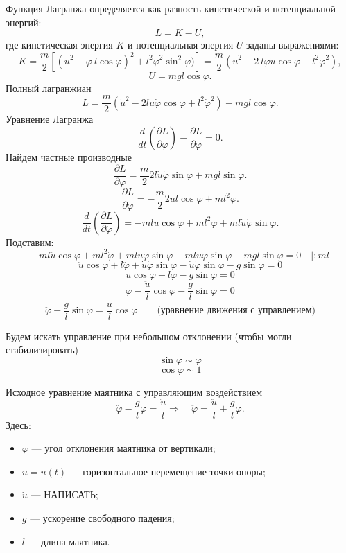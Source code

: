 \documentclass[a4paper, 12pt]{article}
\begin{document}
Функция Лагранжа определяется как разность кинетической и потенциальной энергий:
\[
L = K - U,
\]
где кинетическая энергия \(K\) и потенциальная энергия \(U\) заданы выражениями:
\[
K = \frac{m}{2} [(\dot{u}^2 - \dot\varphi\ l \cos\varphi)^2 + l^2 \dot{\varphi}^2\sin^2\varphi)]=\frac{m}{2} (\dot{u}^2 - 2\ l \dot\varphi\dot{u}\cos\varphi + l^2 \dot{\varphi}^2),
\]
\[
U = mgl\cos\varphi.
\]
Полный лагранжиан
\[
L = \frac{m}{2} (\dot{u}^2 - 2l\dot{u}\dot{\varphi}\cos\varphi + l^2\dot{\varphi}^2) - mgl\cos\varphi.
\]
Уравнение Лагранжа
\[
\frac{d}{dt} \left( \frac{\partial L}{\partial \dot{\varphi}} \right) - \frac{\partial L}{\partial \varphi} = 0.
\]
Найдем частные производные
\[
\frac{\partial L}{\partial \varphi} = \frac{m}{2} 2l\dot{u}\dot{\varphi} \sin\varphi + mgl\sin\varphi.
\]
\[
\frac{\partial L}{\partial \dot{\varphi}} = - \frac{m}{2} 2\dot{u}l\cos\varphi + ml^2\dot{\varphi}.
\]
\[
\frac{d}{dt} \left( \frac{\partial L}{\partial \dot{\varphi}} \right) 
    = -ml\ddot{u} \cos\varphi + ml^2\ddot{\varphi} + ml\dot{u}\dot{\varphi} \sin\varphi.
\]
Подставим:
\[
-ml\ddot{u} \cos\varphi + ml^2\ddot{\varphi} + ml\dot{u}\dot{\varphi} \sin\varphi - ml\dot{u}\dot{\varphi} \sin\varphi - mgl\sin\varphi=0 \quad |:ml
\]
\[
\ddot{u} \cos\varphi + l\ddot{\varphi} + \dot{u}\dot{\varphi} \sin\varphi - \dot{u}\dot{\varphi} \sin\varphi - g\sin\varphi=0
\]
\[
\ddot{u} \cos\varphi + l\ddot{\varphi}  - g\sin\varphi=0
\]
\[
\ddot{\varphi} - \frac{\ddot{u}}{l}\cos\varphi  - \frac{g}{l}\sin\varphi=0
\]
\[
\boxed{\ddot{\varphi} - \frac{g}{l}\sin\varphi = \frac{\ddot{u}}{l}\cos\varphi}
\qquad\text{(уравнение движения с управлением)}
\]

Будем искать управление при небольшом отклонении (чтобы могли стабилизировать)
\[
\sin\varphi\sim \varphi
\]
\[
\cos\varphi\sim1
\]







\newpage
Исходное уравнение маятника с управляющим воздействием
\[
\ddot{\varphi} - \frac{g}{l} \varphi = \frac{\ddot{u}}{l} \Rightarrow \quad 
\ddot{\varphi} = \frac{\ddot{u}}{l} + \frac{g}{l} \varphi.
\]
Здесь:
\begin{itemize}
    \item \(\varphi\) — угол отклонения маятника от вертикали;
    \item \(u = u(t)\) — горизонтальное перемещение точки опоры;
    \item \(\dot{u}\) — НАПИСАТЬ;
    \item \(g\) — ускорение свободного падения;
    \item \(l\) — длина маятника.
\end{itemize}
\end{document}
